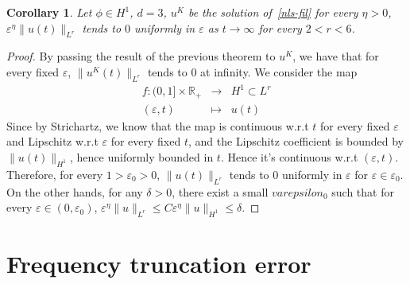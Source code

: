 \documentclass[10pt,a4paper]{article}
\newtheorem{corollary}[theorem]{Corollary}
\begin{document}
  \begin{corollary}\label{cordecayestimate}
    Let \(\phi \in H^1\), \( d = 3 \), \(u^K\) be the solution of~\eqref{nls-fil} 
    for every \(\eta>0\),\(\varepsilon^\eta \|u(t)\|_{L^r}\) tends to \(0\) uniformly in
    \(\varepsilon\) as \(t \to \infty \) for every \( 2 < r < 6\). 
  \end{corollary}

  \begin{proof}
    By passing the result of the previous theorem to \(u^K\), we have that for every fixed \(\varepsilon\),
    \(\|u^K(t)\|_{L^r}\) tends to \(0\) at infinity. We consider the map 
    \[
    \begin{array}{rcl}
      f: (0,1] \times \mathbb R_+ &\rightarrow& H^1 \subset L^r \\
    (\varepsilon,t) &\mapsto& u(t)
    \end{array}
    \]
    Since by Strichartz, we know
    that the map is continuous w.r.t \(t\) for every fixed \(\varepsilon\) 
    and Lipschitz w.r.t \(\varepsilon\) for every fixed \(t\), and the Lipschitz coefficient is bounded by 
    \(\|u(t)\|_{H^1}\), hence uniformly bounded in \(t\).
    Hence it's continuous w.r.t \((\varepsilon,t)\). Therefore,
    for every \(1 > \varepsilon_0 > 0\), \(\|u(t)\|_{L^r}\) tends to \(0\) uniformly in
    \(\varepsilon\) for \(\varepsilon \in \varepsilon_0\). On the other hands,
    for any \(\delta > 0\), there exist a small \(varepsilon_0\) such that for
    every \(\varepsilon \in (0,\varepsilon_0)\), \(\varepsilon^\eta \|u\|_{L^r}
    \leq C \varepsilon^\eta \|u\|_{H^1} \leq \delta\). 
  \end{proof}
  \section{Frequency truncation error}
\end{document}

